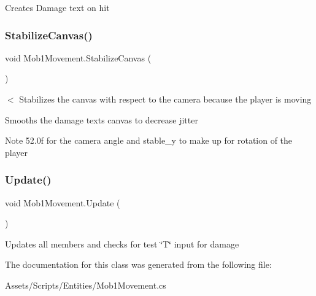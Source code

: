 Creates Damage text on hit \mbox{\label{class_mob1_movement_a77cf67d8073a810fd269199883b485b6}} 
\subsubsection{\texorpdfstring{Stabilize\+Canvas()}{StabilizeCanvas()}}
{\footnotesize\ttfamily void Mob1\+Movement.\+Stabilize\+Canvas (\begin{DoxyParamCaption}{ }\end{DoxyParamCaption})\hspace{0.3cm}{\ttfamily [private]}}



$<$ Stabilizes the canvas with respect to the camera because the player is moving 

Smooths the damage text\textquotesingle{}s canvas to decrease jitter \begin{DoxyNote}{Note}
52.\+0f for the camera angle and stable\+\_\+y to make up for rotation of the player 
\end{DoxyNote}
\mbox{\label{class_mob1_movement_a788bc296f79b07051e91a3c1d1613bc9}} 
\subsubsection{\texorpdfstring{Update()}{Update()}}
{\footnotesize\ttfamily void Mob1\+Movement.\+Update (\begin{DoxyParamCaption}{ }\end{DoxyParamCaption})\hspace{0.3cm}{\ttfamily [private]}}

Updates all members and checks for test \char`\"{}\+T\char`\"{} input for damage 

The documentation for this class was generated from the following file\+:\begin{DoxyCompactItemize}
\item 
Assets/\+Scripts/\+Entities/Mob1\+Movement.\+cs\end{DoxyCompactItemize}
